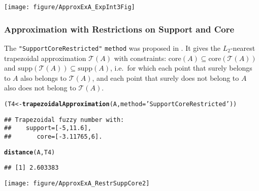 \documentclass[11pt]{article}\usepackage[]{graphicx}\usepackage[]{color}
\makeatletter
\newcommand{\hlstr}[1]{\textcolor[rgb]{0.192,0.494,0.8}{#1}}%
\newcommand{\hlstd}[1]{\textcolor[rgb]{0.345,0.345,0.345}{#1}}%
\newcommand{\hlkwb}[1]{\textcolor[rgb]{0.69,0.353,0.396}{#1}}%
\newcommand{\hlkwc}[1]{\textcolor[rgb]{0.333,0.667,0.333}{#1}}%
\newcommand{\hlkwd}[1]{\textcolor[rgb]{0.737,0.353,0.396}{\textbf{#1}}}%
\newenvironment{kframe}{%
 \def\at@end@of@kframe{}%
 \ifinner\ifhmode%
  \def\at@end@of@kframe{\end{minipage}}%
  \begin{minipage}{\columnwidth}%
 \fi\fi%
 \def\FrameCommand##1{\hskip\@totalleftmargin \hskip-\fboxsep
 \colorbox{shadecolor}{##1}\hskip-\fboxsep
     \hskip-\linewidth \hskip-\@totalleftmargin \hskip\columnwidth}%
 \MakeFramed {\advance\hsize-\width
   \@totalleftmargin\z@ \linewidth\hsize
   \@setminipage}}%
 {\par\unskip\endMakeFramed%
 \at@end@of@kframe}
\newenvironment{knitrout}{}{} %
\newcommand{\argument}[1]{\texttt{\hlkwc{#1}}}
\newcommand{\str}[1]{\texttt{\hlstr{#1}}}
\makeatother
\begin{document}
\begin{center}
\begin{knitrout}\small
{}\color{fgcolor}

{\centering \texttt{[image: figure/ApproxExA\_ExpInt3Fig]} 

}



\end{knitrout}
\end{center}


\subsubsection{Approximation with Restrictions on Support and Core}


The \str{"{}SupportCoreRestricted"{}} \argument{method}
was proposed in \cite{GrzegorzewskiPasternak2011:trapapproxsupcore}.
It gives the $L_2$-nearest trapezoidal approximation $\mathcal{T}(A)$
with constraints:
$\mathrm{core}(A) \subseteq \mathrm{core}(\mathcal{T}(A))$
and $\mathrm{supp}(\mathcal{T}(A)) \subseteq \mathrm{supp}(A)$,
i.e.~for which each point that surely belongs to $A$ also belongs to $\mathcal{T}(A)$,
and each point that surely does not belong to $A$ also does not belong to $\mathcal{T}(A)$.

\begin{knitrout}\small
{}\color{fgcolor}\begin{kframe}
\begin{alltt}
\hlstd{(T4} \hlkwb{<-} \hlkwd{trapezoidalApproximation}\hlstd{(A,} \hlkwc{method}\hlstd{=}\hlstr{'SupportCoreRestricted'}\hlstd{))}
\end{alltt}
\begin{verbatim}
## Trapezoidal fuzzy number with:
##    support=[-5,11.6],
##       core=[-3.11765,6].
\end{verbatim}
\begin{alltt}
\hlkwd{distance}\hlstd{(A, T4)}
\end{alltt}
\begin{verbatim}
## [1] 2.603383
\end{verbatim}
\end{kframe}
\end{knitrout}

\begin{center}
\begin{knitrout}\small
{}\color{fgcolor}

{\centering \texttt{[image: figure/ApproxExA\_RestrSuppCore2]} 

}



\end{knitrout}
\end{center}
\end{document}
